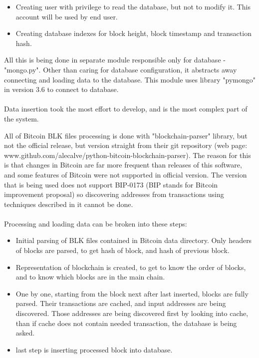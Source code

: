 \documentclass[12pt, en, eng, oneside]{mgr}
\begin{document}
\begin{itemize}
\item
Creating user with privilege to read the database, but not to modify it. This account will be used by end user.
\item
Creating database indexes for block height, block timestamp and transaction hash.
\end{itemize}

All this is being done in separate module responsible only for database - "mongo.py". Other than caring for database configuration, it abstracts away connecting and loading data to the database. This module uses library "pymongo" in version 3.6 to connect to database.
\\
\\  
Data insertion took the most effort to develop, and is the most complex part of the system.

All of Bitcoin BLK files processing is done with "blockchain-parser" library, but not the official release, but version straight from their git repository (web page: www.github.com/alecalve/python-bitcoin-blockchain-parser). The reason for this is that changes in Bitcoin are far more frequent than releases of this software, and some features of Bitcoin were not supported in official version. The version that is being used does not support BIP-0173 (BIP stands for Bitcoin improvement proposal) so discovering addresses from transactions using techniques described in it cannot be done. 
\\
\\
Processing and loading data can be broken into these steps:
\begin{itemize}
\item
Initial parsing of BLK files contained in Bitcoin data directory. Only headers of blocks are parsed, to get hash of block, and hash of previous block.
\item
Representation of blockchain is created, to get to know the order of blocks, and to know which blocks are in the main chain.
\item
One by one, starting from the block next after last inserted, blocks are fully parsed. Their transactions are cached, and input addresses are being discovered. Those addresses are being discovered first by looking into cache, than if cache does not contain needed transaction, the database is being asked.
\item
last step is inserting processed block into database.
\end{itemize}
\end{document}
